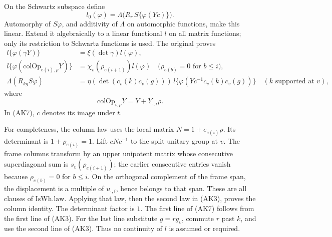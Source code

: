 On the Schwartz subspace define
\[
 l_0(\varphi)=
       \Lambda\bigl(R_r\,S\{\varphi(Yc)\}\bigr).
\]
Automorphy of \(S\varphi\), and additivity of \(\Lambda\) on
automorphic functions, make this linear.
Extend it algebraically to a linear functional \(l\) on all
matrix functions; only its restriction to Schwartz functions is used.
The original  proves
\[
 \begin{split}
 l\{\varphi(\gamma Y)\}&=\xi(\det\gamma)l(\varphi),\\
 l\{\varphi(\mathrm{colOp}_{e(i),\rho}Y)\}
       &=\chi_v(\rho_{e(i+1)})l(\varphi)
       \quad\bigl(\rho_{e(b)}=0\text{ for }b\le i\bigr),\\
 \Lambda(R_{kg}S\varphi)
       &=\eta(\det(c_v(k)c_v(g)))\,
          l\{\varphi(Yc^{-1}c_v(k)c_v(g))\}
                  \quad(k\text{ supported at }v),
 \end{split}\tag{AK7}\label{eq:sr-source-local-whittaker-distribution}
\]
where
\[
 \mathrm{colOp}_{i,\rho}Y
                  =Y+Y_{\cdot,i}\rho .
\]
In (AK7), \(c\) denotes its image under \(t\).

For completeness, the column law uses the local matrix
\(N=1+e_{e(i)}\rho\). Its determinant is \(1+\rho_{e(i)}=1\).
Lift \(cNc^{-1}\) to the split unitary group at \(v\).
The frame columns transform by an upper unipotent matrix whose
consecutive superdiagonal sum is \(s_v(\rho_{e(i+1)})\);
the earlier consecutive entries vanish because
\(\rho_{e(b)}=0\) for \(b\le i\).
On the orthogonal complement of the frame span, the displacement
is a multiple of \(u_{\cdot,i}\), hence belongs to that span.
These are all clauses of \(\mathrm{IsWh.law}\).
Applying that law, then the second law in (AK3), proves the column
identity. The determinant factor is \(1\).
The first line of (AK7) follows from the first line of (AK3).
For the last line substitute \(g=r g_v\), commute \(r\) past \(k\),
and use the second line of (AK3). Thus no continuity of \(l\) is
assumed or required.

